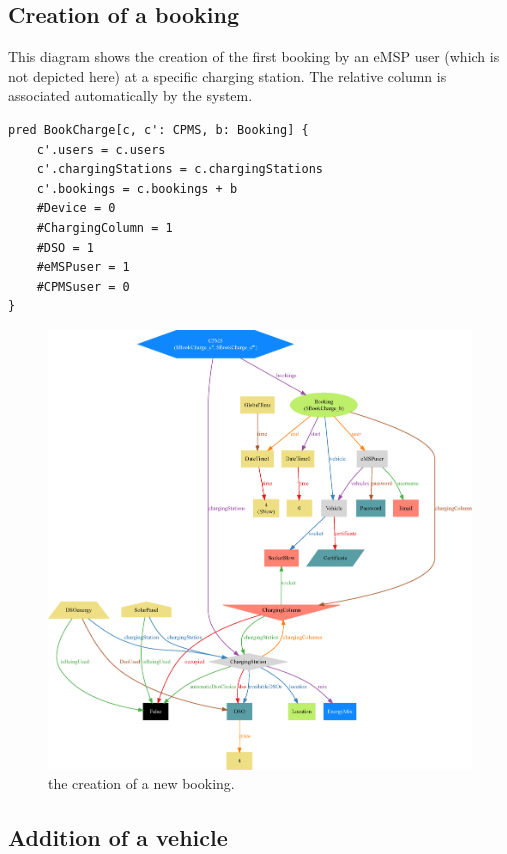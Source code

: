 \pagebreak

\subsection{Creation of a booking}

This diagram shows the creation of the first booking by an eMSP user (which is not depicted here) at a specific charging station. The relative column is associated automatically by the system.

\begin{verbatim}
pred BookCharge[c, c': CPMS, b: Booking] {
    c'.users = c.users
    c'.chargingStations = c.chargingStations
    c'.bookings = c.bookings + b
    #Device = 0
    #ChargingColumn = 1
    #DSO = 1
    #eMSPuser = 1
    #CPMSuser = 0
}
\end{verbatim}

\begin{figure}[h!]
    \centering
    \includegraphics[width=\columnwidth]{./images/alloy/bookCharge}
    \caption{the creation of a new booking.}
\end{figure}

\pagebreak

\subsection{Addition of a vehicle}

